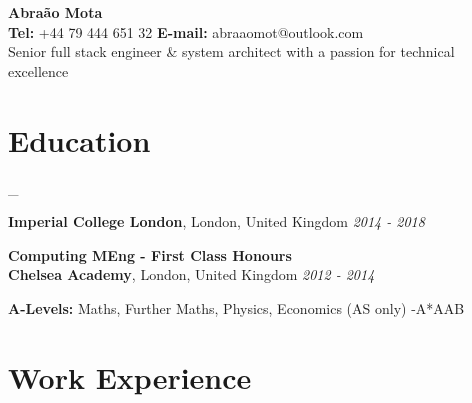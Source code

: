 \documentclass[a4paper,10pt]{article}
\begin{document}
	
	\begin{center}
		{\Large\bfseries Abra\~ao Mota} \\
		\vspace{2mm}
		{\textbf{Tel:} +44 79 444 651 32  } {\textbf{E-mail:} abraaomot@outlook.com } \\ \vspace{1mm}
	Senior full stack engineer \&  system architect with a passion for technical excellence
	\end{center}

	\section*{Education}_
		
		\textbf{Imperial College London}, London, United Kingdom \hfill \textit{2014 - 2018}
		
		\textbf{Computing MEng - First Class Honours} \\
	

		\textbf{Chelsea Academy}, London, United Kingdom \hfill \textit{2012 - 2014 }
		
		\textbf{A-Levels:} Maths, Further Maths, Physics, Economics (AS only) -A*AAB 
		
	
	
	
	
	\section*{Work Experience}
	
\end{document}
